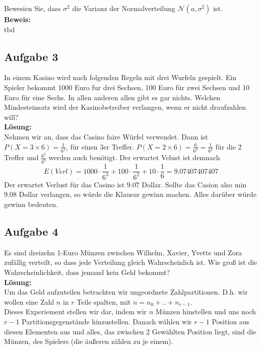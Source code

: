 \documentclass[11pt,a4paper,ngerman]{article}
\begin{document}
Bewesien Sie, dass $\sigma^2$ die Varianz der Normalverteilung $\mathcal{N}(a,\sigma^2)$ ist.\\

\textbf{Beweis:}\\

tbd

\subsection*{Aufgabe 3}

In einem Kasino wird nach folgenden Regeln mit drei Wurfeln gespielt. Ein Spieler
bekommt 1000 Euro fur drei Sechsen, 100 Euro für zwei Sechsen und 10 Euro für
eine Sechs. In allen anderen allen gibt es gar nichts. Welchen Mindesteinsatz wird
der Kasinobetreiber verlangen, wenn er nicht draufzahlen will?\\

\textbf{Lösung:}\\

Nehmen wir an, dass das Casino faire Würfel verwendet. Dann ist
$P( X = 3\times6) = \frac{1}{6^3}$, für einen 3er Treffer. $P( X = 2 \times 6) = \frac{6}{6^3} = \frac{1}{6^2}$ für
die 2 Treffer und $\frac{6^2}{6^3}$ werden auch benötigt. Der erwartet Velust ist demnach
\[
    E(Verl) = 1000 \cdot \frac{1}{6^3} + 100 \cdot \frac{1}{6^2} + 10 \cdot \frac{1}{6} = 9.07407407407
\]
Der erwartet Verlust für das Casino ist $9.07$ Dollar. Sollte das Casion also min $9.08$ Dollar verlangen, so
würde die Klausur gewinn machen. Alles darüber würde gewinn bedeuten.

\subsection*{Aufgabe 4}

Es sind dreizehn 1-Euro Münzen zwischen Wilhelm, Xavier, Yvette und Zora zufällig verteilt, so dass jede Verteilung gleich Wahrscheinlich ist.
Wie groß ist die Wahrscheinlichkeit, dass jemand kein Geld bekommt?\\

\textbf{Lösung:}\\

Um das Geld aufzuteilen betrachten wir ungeordnete Zahlpartitionen. D.h. wir wollen eine Zahl $n$ in $r$ Teile spalten, mit $n = n_0 + .. + n_{r-1}$.\\

Dieses Experiement stellen wir dar, indem wir $n$ Münzen hinstellen und uns noch $r-1$ Partitionsgegenstände hinzustellen. Danach wählen wir $r-1$ Position
aus diesen Elementen aus und alles, das zwischen 2 Gewählten Position liegt, sind die Münzen, des Spielers (die äußeren zählen zu je einem).
\end{document}
